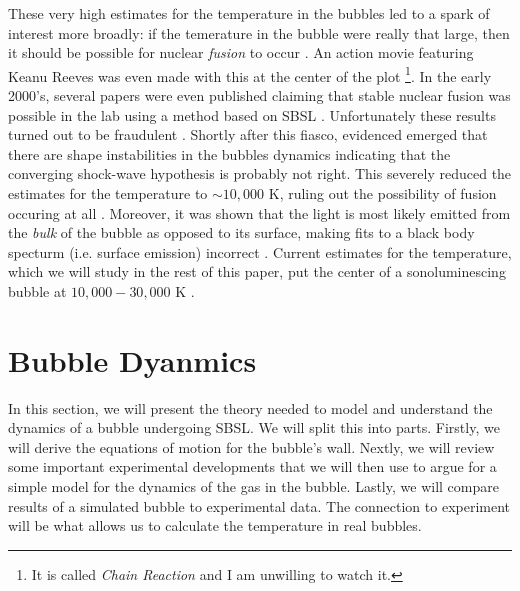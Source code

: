 \documentclass[rmp,aps,nofootinbib,superscriptaddress,floatfix]{revtex4-2}
\begin{document}
These very high estimates for the temperature in the bubbles led to a spark of interest more broadly: if the temerature in the bubble were really that large, then it should be possible for nuclear \emph{fusion} to occur \cite{}. An action movie featuring Keanu Reeves was even made with this at the center of the plot \footnote{It is called \emph{Chain Reaction} and I am unwilling to watch it.}. In the early 2000's, several papers were even published claiming that stable nuclear fusion was possible in the lab using a method based on SBSL \cite{}. Unfortunately these results turned out to be fraudulent \cite{}. Shortly after this fiasco, evidenced emerged that there are shape instabilities in the bubbles dynamics indicating that the converging shock-wave hypothesis is probably not right. This severely reduced the estimates for the temperature to $\sim 10,000$ K, ruling out the possibility of fusion occuring at all \cite{}. Moreover, it was shown that the light is most likely emitted from the \emph{bulk} of the bubble as opposed to its surface, making fits to a black body specturm (i.e. surface emission) incorrect \cite{}. Current estimates for the temperature, which we will study in the rest of this paper, put the center of a sonoluminescing bubble at $10,000-30,000$ K \cite{flannigan2005plasma,suslick2008inside,yasui2018acoustic,an2009diagnosing,an2008spectral,an2006mechanism}.

\section{Bubble Dyanmics}
In this section, we will present the theory needed to model and understand the dynamics of a bubble undergoing SBSL. We will split this into parts. Firstly, we will derive the equations of motion for the bubble's wall. Nextly, we will review some important experimental developments that we will then use to argue for a simple model for the dynamics of the gas in the bubble. Lastly, we will compare results of a simulated bubble to experimental data. The connection to experiment will be what allows us to calculate the temperature in real bubbles.
\end{document}
